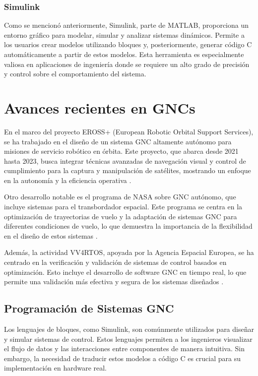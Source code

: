 \subsubsection{Simulink}
Como se mencionó anteriormente, Simulink, parte de MATLAB, proporciona un entorno gráfico para modelar, simular y analizar sistemas dinámicos. 
Permite a los usuarios crear modelos utilizando bloques y, posteriormente, generar código C automáticamente a partir de estos modelos. Esta 
herramienta es especialmente valiosa en aplicaciones de ingeniería donde se requiere un alto grado de precisión y control sobre el 
comportamiento del sistema.

\section{Avances recientes en GNCs }

En el marco del proyecto EROSS+ (European Robotic Orbital Support Services), se ha trabajado en el diseño de un sistema GNC altamente autónomo 
para misiones de servicio robótico en órbita. Este proyecto, que abarca desde 2021 hasta 2023, busca integrar técnicas avanzadas de navegación 
visual y control de cumplimiento para la captura y manipulación de satélites, mostrando un enfoque en la autonomía y la eficiencia operativa \cite{Casu2023EROSSPA}.

Otro desarrollo notable es el programa de NASA sobre GNC autónomo, que incluye sistemas para el transbordador espacial. Este programa se centra en la optimización 
de trayectorias de vuelo y la adaptación de sistemas GNC para diferentes condiciones de vuelo, lo que demuestra la importancia de la flexibilidad en el diseño de 
estos sistemas \cite{Bordano1991AutonomousGN}.

Además, la actividad VV4RTOS, apoyada por la Agencia Espacial Europea, se ha centrado en la verificación y validación de sistemas de control basados en optimización. 
Esto incluye el desarrollo de software GNC en tiempo real, lo que permite una validación más efectiva y segura de los sistemas diseñados \cite{Loureno2023VerificationV}.

\subsection{Programación de Sistemas GNC}
Los lenguajes de bloques, como Simulink, son comúnmente utilizados para diseñar y simular sistemas de control. Estos lenguajes permiten a los ingenieros visualizar 
el flujo de datos y las interacciones entre componentes de manera intuitiva. Sin embargo, la necesidad de traducir estos modelos a código C es crucial para su 
implementación en hardware real.

